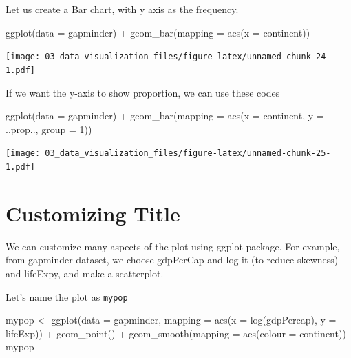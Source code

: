 \documentclass[
  10pt,
]{krantz}
\newenvironment{Shaded}{\begin{snugshade}}{\end{snugshade}}
\newcommand{\AttributeTok}[1]{\textcolor[rgb]{0.77,0.63,0.00}{#1}}
\newcommand{\DecValTok}[1]{\textcolor[rgb]{0.00,0.00,0.81}{#1}}
\newcommand{\FunctionTok}[1]{\textcolor[rgb]{0.00,0.00,0.00}{#1}}
\newcommand{\NormalTok}[1]{#1}
\newcommand{\OtherTok}[1]{\textcolor[rgb]{0.56,0.35,0.01}{#1}}
\newcommand{\SpecialCharTok}[1]{\textcolor[rgb]{0.00,0.00,0.00}{#1}}
\begin{document}
Let us create a Bar chart, with y axis as the frequency.

\begin{Shaded}
\begin{Highlighting}[]
\FunctionTok{ggplot}\NormalTok{(}\AttributeTok{data =}\NormalTok{ gapminder) }\SpecialCharTok{+}
  \FunctionTok{geom\_bar}\NormalTok{(}\AttributeTok{mapping =} \FunctionTok{aes}\NormalTok{(}\AttributeTok{x =}\NormalTok{ continent))}
\end{Highlighting}
\end{Shaded}

\texttt{[image: 03\_data\_visualization\_files/figure-latex/unnamed-chunk-24-1.pdf]}

If we want the y-axis to show proportion, we can use these codes

\begin{Shaded}
\begin{Highlighting}[]
\FunctionTok{ggplot}\NormalTok{(}\AttributeTok{data =}\NormalTok{ gapminder) }\SpecialCharTok{+}
  \FunctionTok{geom\_bar}\NormalTok{(}\AttributeTok{mapping =} \FunctionTok{aes}\NormalTok{(}\AttributeTok{x =}\NormalTok{ continent, }\AttributeTok{y =}\NormalTok{ ..prop..,}
                         \AttributeTok{group =} \DecValTok{1}\NormalTok{))}
\end{Highlighting}
\end{Shaded}

\texttt{[image: 03\_data\_visualization\_files/figure-latex/unnamed-chunk-25-1.pdf]}

\hypertarget{customizing-title}{%
\section{Customizing Title}\label{customizing-title}}

We can customize many aspects of the plot using ggplot package. For example, from gapminder dataset, we choose gdpPerCap and log it (to reduce skewness) and lifeExpy, and make a scatterplot.

Let's name the plot as \texttt{mypop}

\begin{Shaded}
\begin{Highlighting}[]
\NormalTok{mypop }\OtherTok{\textless{}{-}} \FunctionTok{ggplot}\NormalTok{(}\AttributeTok{data =}\NormalTok{ gapminder, }
                \AttributeTok{mapping =} \FunctionTok{aes}\NormalTok{(}\AttributeTok{x =} \FunctionTok{log}\NormalTok{(gdpPercap), }
                              \AttributeTok{y =}\NormalTok{ lifeExp)) }\SpecialCharTok{+}
  \FunctionTok{geom\_point}\NormalTok{() }\SpecialCharTok{+}
  \FunctionTok{geom\_smooth}\NormalTok{(}\AttributeTok{mapping =} \FunctionTok{aes}\NormalTok{(}\AttributeTok{colour =}\NormalTok{ continent))}
\NormalTok{mypop}
\end{Highlighting}
\end{Shaded}
\end{document}
